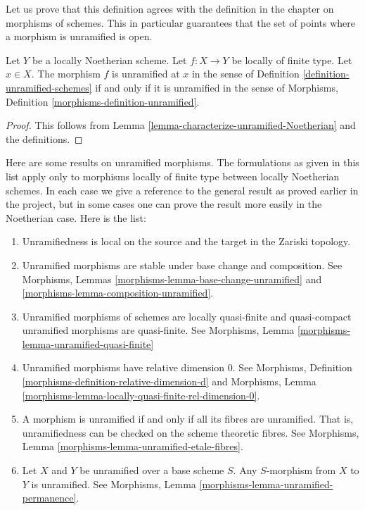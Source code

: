 \noindent
Let us prove that this definition agrees with the definition in the
chapter on morphisms of schemes. This in particular guarantees that the
set of points where a morphism is unramified is open.

\begin{lemma}
\label{lemma-unramified-definition}
Let $Y$ be a locally Noetherian scheme.
Let $f : X \to Y$ be locally of finite type.
Let $x \in X$. The morphism $f$ is unramified at $x$ in
the sense of Definition \ref{definition-unramified-schemes}
if and only if it is unramified in
the sense of Morphisms, Definition \ref{morphisms-definition-unramified}.
\end{lemma}

\begin{proof}
This follows from Lemma \ref{lemma-characterize-unramified-Noetherian}
and the definitions.
\end{proof}

\noindent
Here are some results on unramified morphisms.
The formulations as given in this list apply only to
morphisms locally of finite type between locally Noetherian schemes.
In each case we give a reference to the general result as
proved earlier in the project, but in some cases one can
prove the result more easily in the Noetherian case.
Here is the list:
\begin{enumerate}
\item Unramifiedness is local on the source and the target in the Zariski
topology.
\item Unramified morphisms are stable under base change and composition.
See Morphisms, Lemmas \ref{morphisms-lemma-base-change-unramified}
and \ref{morphisms-lemma-composition-unramified}.
\item Unramified morphisms of schemes are locally quasi-finite
and quasi-compact unramified morphisms are quasi-finite.
See Morphisms, Lemma \ref{morphisms-lemma-unramified-quasi-finite}
\item Unramified morphisms have relative dimension $0$. See
Morphisms, Definition \ref{morphisms-definition-relative-dimension-d}
and
Morphisms, Lemma \ref{morphisms-lemma-locally-quasi-finite-rel-dimension-0}.
\item A morphism is unramified if and only if all its fibres are unramified.
That is, unramifiedness can be checked on the scheme theoretic fibres. See
Morphisms, Lemma \ref{morphisms-lemma-unramified-etale-fibres}.
\item Let $X$ and $Y$ be unramified over a base scheme $S$.
Any $S$-morphism from $X$ to $Y$ is unramified.
See Morphisms, Lemma \ref{morphisms-lemma-unramified-permanence}.
\end{enumerate}

